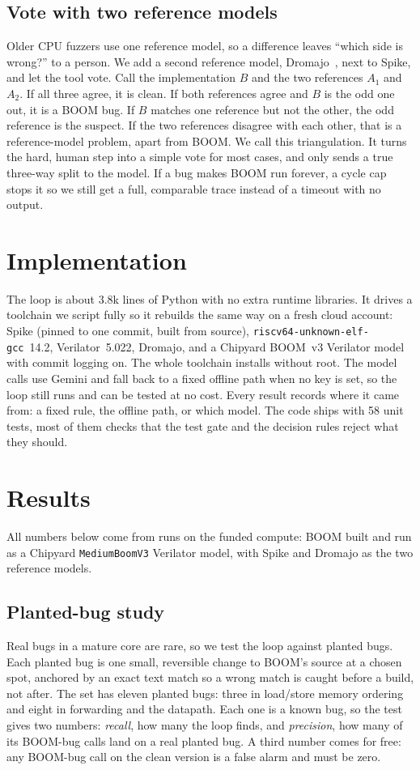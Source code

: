 \documentclass[conference]{IEEEtran}
\newcommand{\code}[1]{\texttt{\small #1}}
\begin{document}
\subsection{Vote with two reference models}
Older CPU fuzzers use one reference model, so a difference leaves ``which side
is wrong?'' to a person. We add a second reference model, Dromajo~\cite{dromajo},
next to Spike, and let the tool vote. Call the implementation $B$ and the two
references $A_1$ and $A_2$. If all three agree, it is clean. If both references
agree and $B$ is the odd one out, it is a BOOM bug. If $B$ matches one reference
but not the other, the odd reference is the suspect. If the two references
disagree with each other, that is a reference-model problem, apart from BOOM. We
call this triangulation. It turns the hard, human step into a simple vote for
most cases, and only sends a true three-way split to the model. If a bug makes
BOOM run forever, a cycle cap stops it so we still get a full, comparable trace
instead of a timeout with no output.

\section{Implementation}
The loop is about 3.8k lines of Python with no extra runtime libraries. It
drives a toolchain we script fully so it rebuilds the same way on a fresh cloud
account: Spike (pinned to one commit, built from source),
\code{riscv64-unknown-elf-gcc}~14.2, Verilator~5.022, Dromajo, and a Chipyard
BOOM~v3 Verilator model with commit logging on. The whole toolchain installs
without root. The model calls use Gemini and fall back to a fixed offline path
when no key is set, so the loop still runs and can be tested at no cost. Every
result records where it came from: a fixed rule, the offline path, or which
model. The code ships with 58 unit tests, most of them checks that the test
gate and the decision rules reject what they should.

\section{Results}
All numbers below come from runs on the funded compute: BOOM built and run as a
Chipyard \code{MediumBoomV3} Verilator model, with Spike and Dromajo as the two
reference models.

\subsection{Planted-bug study}
Real bugs in a mature core are rare, so we test the loop against planted bugs.
Each planted bug is one small, reversible change to BOOM's source at a chosen
spot, anchored by an exact text match so a wrong match is caught before a build,
not after. The set has eleven planted bugs: three in load/store memory ordering
and eight in forwarding and the datapath. Each one is a known bug, so the test
gives two numbers: \emph{recall}, how many the loop finds, and \emph{precision},
how many of its BOOM-bug calls land on a real planted bug. A third number comes
for free: any BOOM-bug call on the clean version is a false alarm and must be
zero.
\end{document}
